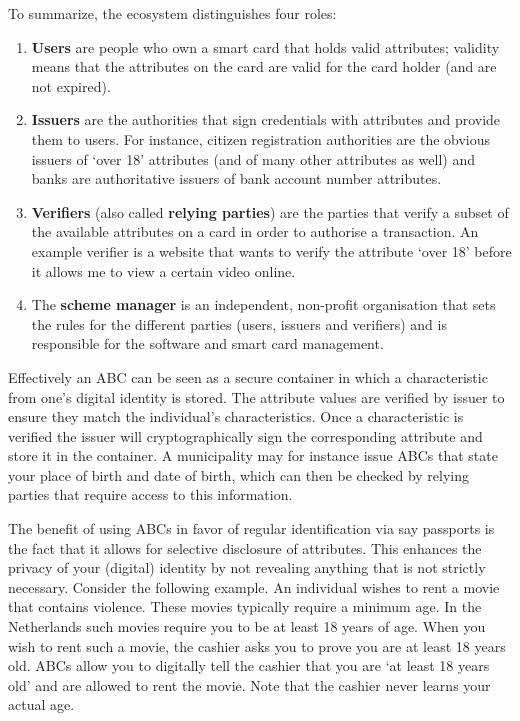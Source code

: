 To summarize, the ecosystem distinguishes four roles:
\begin{enumerate}
  \item \textbf{Users} are people who own a smart card that holds valid attributes; validity means that the attributes on the card are valid for the card holder (and are not expired).
  \item \textbf{Issuers} are the authorities that sign credentials with attributes and provide them to users. For  instance, citizen registration authorities are the obvious issuers of `over 18' attributes (and of many other attributes as well) and banks are authoritative issuers of bank account number attributes.
  \item \textbf{Verifiers} (also called \textbf{relying parties}) are the parties that verify a subset of the available attributes on a card in order to authorise a transaction. An example verifier is a website that wants to verify the attribute ‘over 18’ before it allows me to view a certain video online.
  \item The \textbf{scheme manager} is an independent, non-profit organisation that sets the rules for the different parties (users, issuers and verifiers) and is responsible for the software and smart card management.
\end{enumerate}

Effectively an ABC can be seen as a secure container in which a characteristic from one's digital identity is stored. The attribute values are verified by issuer to ensure they match the individual's characteristics. Once a characteristic is verified the issuer will cryptographically sign the corresponding attribute and store it in the container. A municipality may for instance issue ABCs that state your place of birth and date of birth, which can then be checked by relying parties that require access to this information.

The benefit of using ABCs in favor of regular identification via say passports is the fact that it allows for selective disclosure of attributes. This enhances the privacy of your (digital) identity by not revealing anything that is not strictly necessary. Consider the following example. An individual wishes to rent a movie that contains violence. These movies typically require a minimum age. In the Netherlands such movies require you to be at least 18 years of age. When you wish to rent such a movie, the cashier asks you to prove you are at least 18 years old. ABCs allow you to digitally tell the cashier that you are `at least 18 years old' and are allowed to rent the movie. Note that the cashier never learns your actual age.


